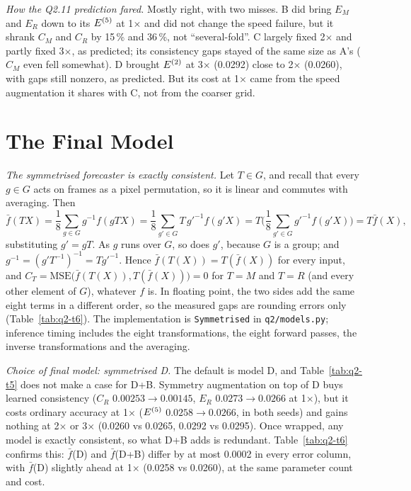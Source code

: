 \emph{How the Q2.11 prediction fared.} Mostly right, with two misses. B did bring $E_M$ and $E_R$ down to its
$E^{(5)}$ at 1$\times$ and did not change the speed failure, but it shrank $C_M$ and $C_R$ by 15\,\% and
36\,\%, not ``several-fold''. C largely fixed 2$\times$ and partly fixed 3$\times$, as predicted; its
consistency gaps stayed of the same size as A's ($C_M$ even fell somewhat). D brought $E^{(2)}$ at 3$\times$
(0.0292) close to 2$\times$ (0.0260), with gaps still nonzero, as predicted. But its cost at 1$\times$ came
from the speed augmentation it shares with C, not from the coarser grid.

\section{The Final Model}
\emph{The symmetrised forecaster is exactly consistent.} Let $T\in G$, and recall that every $g\in G$
acts on frames as a pixel permutation, so it is linear and commutes with averaging. Then
\[
\bar f(TX)=\frac18\sum_{g\in G} g^{-1} f(gTX)
=\frac18\sum_{g'\in G}T\,g'^{-1} f(g'X)=T\Big(\frac18\sum_{g'\in G}g'^{-1}f(g'X)\Big)=T\bar f(X),
\]
substituting $g'=gT$. As $g$ runs over $G$, so does $g'$, because $G$ is a group; and
$g^{-1}=(g'T^{-1})^{-1}=Tg'^{-1}$. Hence $\bar f(T(X))=T(\bar f(X))$ for every input, and
$C_T=\mathrm{MSE}\big(\bar f(T(X)),T(\bar f(X))\big)=0$ for $T=M$ and $T=R$ (and every other element of
$G$), whatever $f$ is. In floating point, the two sides add the same eight terms in a different order,
so the measured gaps are rounding errors only (Table~\ref{tab:q2-t6}). The implementation is
\texttt{Symmetrised} in \texttt{q2/models.py}; inference timing includes the eight transformations, the
eight forward passes, the inverse transformations and the averaging.

\emph{Choice of final model: symmetrised D.} The default is model D, and Table~\ref{tab:q2-t5} does not
make a case for D+B. Symmetry augmentation on top of D buys learned consistency ($C_R$ $0.00253\to0.00145$,
$E_R$ $0.0273\to0.0266$ at 1$\times$), but it costs ordinary accuracy at 1$\times$ ($E^{(5)}$
$0.0258\to0.0266$, in both seeds) and gains nothing at 2$\times$ or 3$\times$ (0.0260 vs 0.0265,
0.0292 vs 0.0295). Once wrapped, any model is exactly consistent, so what D+B adds is redundant.
Table~\ref{tab:q2-t6} confirms this: $\bar f$(D) and $\bar f$(D+B) differ by at most 0.0002 in every
error column, with $\bar f$(D) slightly ahead at 1$\times$ (0.0258 vs 0.0260), at the same parameter count and cost.

